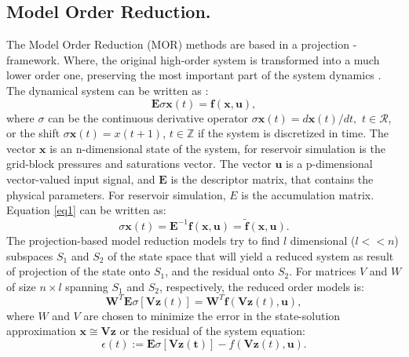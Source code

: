 \documentclass[12pt]{report}
\begin{document}
\subsection*{Model Order Reduction.}
The Model Order Reduction (MOR) methods are based in a projection - framework. Where, the original 
high-order system is transformed into a much lower order one, 
preserving the most important part of the system dynamics \cite{Mark06,Astrid11}.\\ 
The dynamical system can be written as \cite{Mark06}:
\begin{equation}\label{eq1}
\mathbf{E}\sigma \mathbf{x}(t) = \mathbf{f}(\mathbf{x}, \mathbf{u}),
\end{equation}
where $\sigma$ can be the continuous derivative operator $\sigma \mathbf{x}(t)=d\mathbf{x}(t)/dt,$ 
$t \in \mathcal{R}$,
or the shift $\sigma \mathbf{x}(t)=x(t+1)$, $t \in \mathbb{Z}$ if the system is discretized in time. 
The vector $\mathbf{x}$ is an n-dimensional state of the system, for reservoir 
simulation is the grid-block pressures and saturations vector. The vector $\mathbf{u}$ is a p-dimensional 
vector-valued input signal, and $\mathbf{E}$ is the descriptor matrix, that contains the physical parameters.
For reservoir simulation, $E$ is the accumulation matrix. \\
Equation \eqref{eq1} can be written as:
\begin{equation}\label{eq2}
\sigma \mathbf{x}(t) =\mathbf{E}^{-1} \mathbf{f}(\mathbf{x},\mathbf{u})=\tilde{\mathbf{f}}(\mathbf{x},\mathbf{u}).
\end{equation} 
The projection-based model reduction models try to find $l$ dimensional ($l<<n$) subspaces $S_1$ and $S_2$ of 
the state space that will yield a reduced system as result of projection of the state onto $S_1$, and the residual onto $S_2$.
For matrices $V$ and $W$ of size $n \times l$ spanning $S_1$ and $S_2$, respectively, 
the reduced order models is:
\begin{equation}\label{eq3}
\mathbf{W}^T \mathbf{E}\sigma [\mathbf{V} \mathbf{z}(t)]=\mathbf{W}^T \mathbf{f}(\mathbf{V} \mathbf{z}(t),\mathbf{u}),
\end{equation} 
where $W$ and $V$ are chosen to minimize the error in the state-solution 
approximation $\mathbf{x} \cong \mathbf{V}\mathbf{z}$ or the residual of the system equation: 
\begin{equation}
\epsilon (t) := \mathbf{E}\sigma [\mathbf{V}\mathbf{z(t)}]-f(\mathbf{V}\mathbf{z}(t),\mathbf{u}).
\end{equation}
\end{document}
